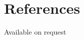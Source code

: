 \documentclass[letterpaper]{deedy-resume} %
\begin{document}
\begin{minipage}[t]{0.33\textwidth}
\sectionspace %
\sectionspace %

\section{References}
\sectionspace %
Available on request

\sectionspace %



%
%
%
%


\end{minipage} %
\hfill
%
%
\end{document}
